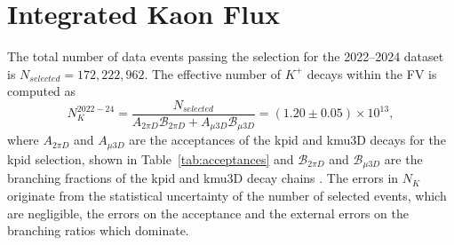 \documentclass[../../main.tex]{subfiles}
\begin{document}
    \section{Integrated Kaon Flux}\label{sec:kaonFlux}
    The total number of data events passing the selection for the 2022--2024 dataset is $N_{selected} = 172,222,962$. The effective number of $K^+$ decays within the \gls{FV} is computed as 
    \begin{equation}\label{eq:nk}
        N_K^{2022-24} = \frac{N_{selected}}{A_{2 \pi D} \mathcal{B}_{2 \pi D} + A_{\mu 3D} \mathcal{B}_{\mu 3D}} =  (1.20 \pm 0.05) \times 10^{13}, %
    \end{equation}
    where $A_{2 \pi D}$ and $A_{\mu 3D}$ are the acceptances of the \gls{kpid} and \gls{kmu3D} decays for the \gls{kpid} selection, shown in Table~\ref{tab:acceptances} and $\mathcal{B}_{2 \pi D}$ and $\mathcal{B}_{\mu 3D}$ are the branching fractions of the \gls{kpid} and \gls{kmu3D} decay chains \cite{Navas:2024}. 
    The errors in $N_K$ originate from the statistical uncertainty of the number of selected events, which are negligible, the errors on the acceptance and the external errors on the branching ratios which dominate.
    

\end{document}
